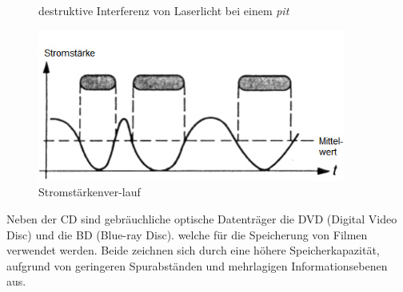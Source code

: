 \begin{figure}[h]
\begin{center}
\begin{minipage}[t]{0.3\textwidth}
\begin{center}
                \caption[destruktive Interferenz von Laserlicht bei einem \textit{pit} \newline \url{http://www.muenster.de/~asshoff/physik/cd/image50.gif} (zuletzt aufgerufen am 07.08.2015)]{destruktive Interferenz von Laserlicht bei einem \textit{pit}}
                \label{fig:cdlaser}
            \end{center}
        \end{minipage}
        \hspace{0.025\textwidth}
        \begin{minipage}[t]{0.3\textwidth}
            \begin{center}
                \includegraphics[width=0.9\textwidth]{Bilder/Optische_Datentraeger_Die_Compact_Disc/Funktionsweise/cdstrom.png}
                \caption[Stromstärkenverlauf \newline \url{http://www.muenster.de/~asshoff/physik/cd/image51.gif} (zuletzt aufgerufen am 07.08.2015)]{Stromstärkenver-lauf}
                \label{fig:cdstrom}
            \end{center}
        \end{minipage}
    \end{center}
\end{figure}

Neben der CD sind gebräuchliche optische Datenträger die DVD (Digital Video
Disc) und die BD (Blue-ray Disc). welche für die Speicherung von Filmen
verwendet werden. Beide zeichnen sich durch eine höhere Speicherkapazität,
aufgrund von geringeren Spurabständen und mehrlagigen Informationsebenen aus.

